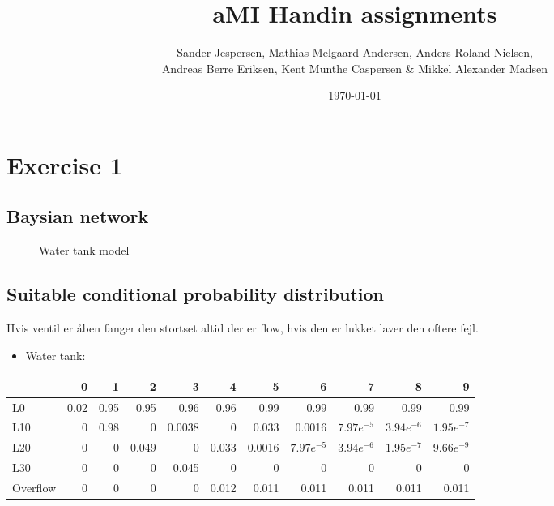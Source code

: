 \documentclass[colorlinks=true,linkcolor=blue]{article}
\author{Sander Jespersen, Mathias Melgaard Andersen, Anders Roland Nielsen, \\ Andreas Berre Eriksen, Kent Munthe Caspersen \& Mikkel Alexander Madsen}
\date{\today}
\title{aMI Handin assignments}
\begin{document}
\maketitle

\section{Exercise 1}
\label{sec-1}
\subsection{Baysian network}
\label{sec-1-1}
\begin{figure}[!htb]
  \centering
  \caption{Water tank model}
  \label{fig:A1}
\end{figure}

\subsection{Suitable conditional probability distribution}
\label{sec-1-2}
Hvis ventil er åben fanger den stortset altid der er flow, hvis den er lukket laver den oftere fejl.

\begin{itemize}
\item Water tank:
\end{itemize}
\begin{center}
\begin{tabular}{l|rrrrrrrrrr|}
 & 0 & 1 & 2 & 3 & 4 & 5 & 6 & 7 & 8 & 9\\
\hline
L0 & 0.02 & 0.95 & 0.95 & 0.96 & 0.96 & 0.99 & 0.99 & 0.99 & 0.99 & 0.99\\
L10 & 0 & 0.98 & 0 & 0.0038 & 0 & 0.033 & 0.0016 & $7.97e^{-5}$ & $3.94e^{-6}$ & $1.95e^{-7}$\\
L20 & 0 & 0 & 0.049 & 0 & 0.033 & 0.0016 & $7.97e^{-5}$ & $3.94e^{-6}$ & $1.95e^{-7}$ & $9.66e^{-9}$\\
L30 & 0 & 0 & 0 & 0.045 & 0 & 0 & 0 & 0 & 0 & 0\\
Overflow & 0 & 0 & 0 & 0 & 0.012 & 0.011 & 0.011 & 0.011 & 0.011 & 0.011\\
\end{tabular}
\end{center}
\end{document}
